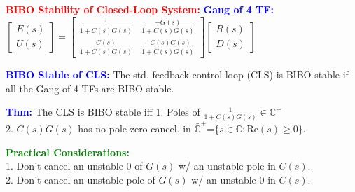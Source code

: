 \documentclass[5pt]{extarticle} %
\begin{document}
\begin{paracol}{3}
{    \textcolor{red}{\textbf{BIBO Stability of Closed-Loop System:}} \textcolor{blue}{\textbf{Gang of 4 TF:}} \\
    $\begin{bmatrix}
        E(s) \\
        U(s)
    \end{bmatrix} =
    \begin{bmatrix}
        \frac{1}{1+C(s)G(s)} & \frac{-G(s)}{1+C(s)G(s)} \\
        \frac{C(s)}{1+C(s)G(s)} & \frac{-C(s)G(s)}{1+C(s)G(s)}
    \end{bmatrix} 
    \begin{bmatrix}
        R(s) \\
        D(s)
    \end{bmatrix}
    $ 

    \textcolor{blue}{\textbf{BIBO Stable of CLS:}} The std. feedback control loop (CLS) is BIBO stable if all the Gang of 4 TFs are BIBO stable.

    \textcolor{blue}{\textbf{Thm:}} The CLS is BIBO stable iff 1. Poles of $\frac{1}{1 + C(s)G(s)} \in \mathbb{C}^{-}$ \\
    2. $C(s)G(s)$ has no pole-zero cancel. in $\bar{\mathbb{C}}^{+} \text{=} \{ s \in \mathbb{C} : \text{Re}(s) \geq 0 \}$. 

    \textcolor{green}{\textbf{Practical Considerations:}} \\
    1. Don't cancel an unstable 0 of $G(s)$ w/ an unstable pole in $C(s)$. \\
    2. Don't cancel an unstable pole of $G(s)$ w/ an unstable 0 in $C(s)$. \\




        }
\end{paracol}
\end{document}
